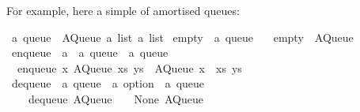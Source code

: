 \begin{isabellebody}
\begin{isamarkuptext}
  For example, here a simple  of amortised queues:%
\end{isamarkuptext}%
\isamarkuptrue%
%
\isadelimquote
%
\endisadelimquote
%
\isatagquote
{}\isamarkupfalse%
\ {}a\ queue\ {}\ AQueue\ {}{}a\ list{}\ {}{}a\ list{}\isanewline
\isanewline
{}\isamarkupfalse%
\ empty\ {}{}\ {}{}a\ queue{}\ \isanewline
\ \ {}empty\ {}\ AQueue\ {}{}\ {}{}{}\isanewline
\isanewline
{}\isamarkupfalse%
\ enqueue\ {}{}\ {}{}a\ {}\ {}a\ queue\ {}\ {}a\ queue{}\ \isanewline
\ \ {}enqueue\ x\ {}AQueue\ xs\ ys{}\ {}\ AQueue\ {}x\ {}\ xs{}\ ys{}\isanewline
\isanewline
{}\isamarkupfalse%
\ dequeue\ {}{}\ {}{}a\ queue\ {}\ {}a\ option\ {}\ {}a\ queue{}\ \isanewline
\ \ \ \ {}dequeue\ {}AQueue\ {}{}\ {}{}{}\ {}\ {}None{}\ AQueue\ {}{}\ {}{}{}{}\isanewline

\end{isabellebody}
